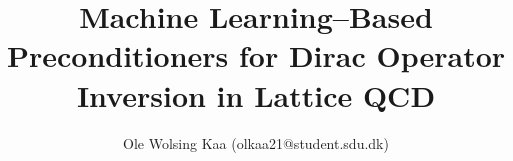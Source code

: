 \usepackage{todonotes}
\usepackage{tcolorbox}


\newenvironment{correction}{\begin{tcolorbox}[
    arc=0mm,
    colback=white,
    colframe=green!60!black,
    title=Correction,
    fonttitle=\sffamily,
    breakable
]}{\end{tcolorbox}}


\usepackage{import}
\usepackage{xifthen}
\usepackage{pdfpages}
\usepackage{transparent}
\newcommand{\incfig}[2][1]{%
    \def\svgwidth{#1\columnwidth}
    {#2.pdf_tex}
}




\makeatletter
\newcommand{\subalign}[1]{%
  \vcenter{%
    \Let@ \restore@math@cr \default@tag
    \baselineskip\fontdimen10 \scriptfont\tw@
    \advance\baselineskip\fontdimen12 \scriptfont\tw@
    \lineskip\thr@@\fontdimen8 \scriptfont\thr@@
    \lineskiplimit\lineskip
    \ialign{\hfil$\m@th\scriptstyle##$&$\m@th\scriptstyle{}##$\hfil\crcr
      #1\crcr
    }%
  }%
}
\makeatother


\usepackage{blindtext}
\usepackage{scrextend}
\usepackage{enumitem}

\usepackage{tikz-3dplot}
\usetikzlibrary{patterns}
\usetikzlibrary{positioning}

\usepackage{setspace}
\usepackage[backend=biber, style=numeric]{biblatex}





\usepackage{tabularx}


\usepackage{minted}
\title{Machine Learning–Based Preconditioners for Dirac Operator Inversion in Lattice QCD}
\author{Ole Wolsing Kaa (olkaa21@student.sdu.dk)}

